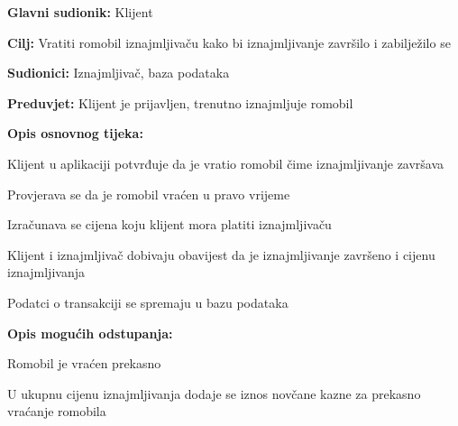 						\noindent {}
						\begin{packed_item}
							
							\item \textbf{Glavni sudionik: }Klijent
							\item  \textbf{Cilj: }Vratiti romobil iznajmljivaču kako bi iznajmljivanje završilo i zabilježilo se
							\item  \textbf{Sudionici: }Iznajmljivač, baza podataka
							\item  \textbf{Preduvjet: }Klijent je prijavljen, trenutno iznajmljuje romobil
							\item  \textbf{Opis osnovnog tijeka:}
							
							\item[] \begin{packed_enum}
								
								\item Klijent u aplikaciji potvrđuje da je vratio romobil čime iznajmljivanje završava 
								\item Provjerava se da je romobil vraćen u pravo vrijeme 
								\item Izračunava se cijena koju klijent mora platiti iznajmljivaču 
								\item Klijent i iznajmljivač dobivaju obavijest da je iznajmljivanje završeno i cijenu iznajmljivanja  
								\item Podatci o transakciji se spremaju u bazu podataka
							\end{packed_enum}
							
							\item  \textbf{Opis mogućih odstupanja:}
							
							\item[] \begin{packed_item}
								
								\item[2.a] Romobil je vraćen prekasno 
								\item[] \begin{packed_enum}
									
									\item U ukupnu cijenu iznajmljivanja dodaje se iznos novčane kazne za prekasno vraćanje romobila 
									
									
								\end{packed_enum}
								
							\end{packed_item}
						\end{packed_item}
